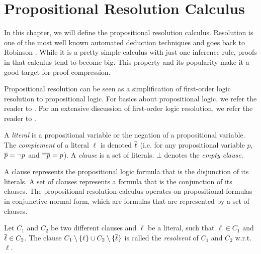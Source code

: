 \section{Propositional Resolution Calculus}
\label{sec:resolution}

In this chapter, we will define the propositional resolution calculus.
Resolution is one of the most well known automated deduction techniques and goes back to Robinson \cite{Robinson1965}.
While it is a pretty simple calculus with just one inference rule, proofs in that calculus tend to become big.
This property and its popularity make it a good target for proof compression.

Propositional resolution can be seen as a simplification of first-order logic resolution to propositional logic.
For basics about propositional logic, we refer the reader to \cite{Biere2009}.
For an extensive discussion of first-order logic resolution, we refer the reader to \cite{Leitsch1997}.

\begin{definition}

A \emph{literal} is a propositional variable or the negation of a propositional variable. 
The \emph{complement} of a literal $\ell$ is denoted $\overline{\ell}$ (i.e. for any propositional variable $p$,
$\overline{p} = \neg p$ and $\overline{\neg p} = p$). 
A \emph{clause} is a set of literals. 
$\bot$ denotes the \emph{empty clause}.

\end{definition}

A clause represents the propositional logic formula that is the disjunction of its literals.
A set of clauses represents a formula that is the conjunction of its clauses.
The propositional resolution calculus operates on propositional formulas in conjunctive normal form, which are formulas that are represented by a set of clauses.

\begin{definition}[Resolvent]

Let $C_1$ and $C_2$ be two different clauses and $\ell$ be a literal, such that $\ell \in C_1$ and $\overline{\ell} \in C_2$.
The clause $C_1 \setminus \{\ell\} \cup C_2 \setminus \{\overline{\ell}\}$ is called the \emph{resolvent} of $C_1$ and $C_2$ w.r.t. $\ell$.

\end{definition}

